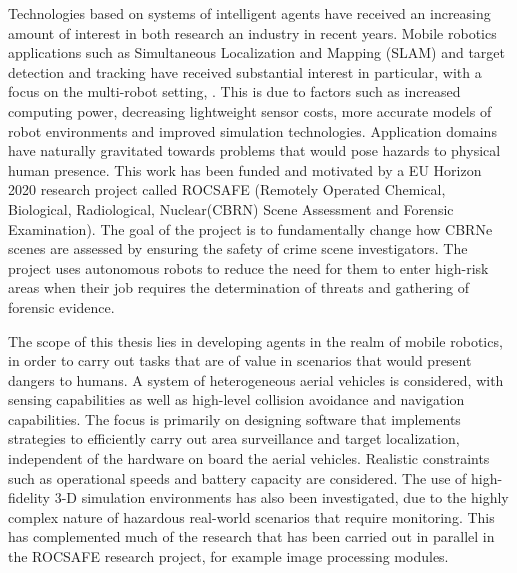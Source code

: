 
Technologies based on systems of intelligent agents have received an increasing amount of interest in both research an industry in recent years. Mobile robotics applications such as Simultaneous Localization and Mapping (SLAM) and target detection and tracking have received substantial interest in particular, with a focus on the multi-robot setting\cite{Saeedi2016Multiple-RobotReview}, \cite{Robin2016Multi-robotSurvey}. This is due to factors such as increased computing power, decreasing lightweight sensor costs, more accurate models of robot environments and improved simulation technologies. Application domains have naturally gravitated towards problems that would pose hazards to physical human presence. This work has been funded and motivated by a EU Horizon 2020 research project called ROCSAFE (Remotely Operated Chemical, Biological, Radiological, Nuclear(CBRN) Scene Assessment and Forensic Examination)\cite{rocsafeNUIG}. The goal of the project is to fundamentally change how CBRNe scenes are assessed by ensuring the safety of crime scene investigators. The project uses autonomous robots to reduce the need for them to enter high-risk areas when their job requires the determination of threats and gathering of  forensic evidence.\par

The scope of this thesis lies in developing agents in the realm of mobile robotics, in order to carry out tasks that are of value in scenarios that would present dangers to humans. A system of heterogeneous aerial vehicles is considered, with sensing capabilities as well as high-level collision avoidance and navigation capabilities. The focus is primarily on designing software that implements strategies to efficiently carry out area surveillance and target localization, independent of the hardware on board the aerial vehicles. Realistic constraints such as operational speeds and battery capacity are considered. The use of high-fidelity 3-D simulation environments has also been investigated, due to the highly complex nature of hazardous real-world scenarios that require monitoring. This has complemented much of the research that has been carried out in parallel in the ROCSAFE research project, for example image processing modules.\par